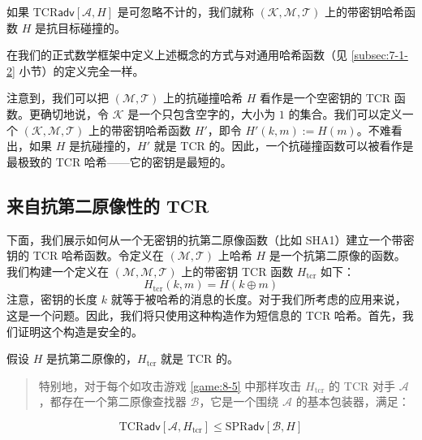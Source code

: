 \begin{definition}\label{def:8-7}
如果 $\mathrm{TCR}\mathsf{adv}[\mathcal{A},H]$ 是可忽略不计的，我们就称 $(\mathcal{K},\mathcal{M},\mathcal{T})$ 上的带密钥哈希函数 $H$ 是抗目标碰撞的。
\end{definition}


在我们的正式数学框架中定义上述概念的方式与对通用哈希函数（见 \ref{subsec:7-1-2} 小节）的定义完全一样。

注意到，我们可以把 $(\mathcal{M},\mathcal{T})$ 上的抗碰撞哈希 $H$ 看作是一个空密钥的 TCR 函数。更确切地说，令 $\mathcal{K}$ 是一个只包含空字的，大小为 $1$ 的集合。我们可以定义一个 $(\mathcal{K},\mathcal{M},\mathcal{T})$ 上的带密钥哈希函数 $H'$，即令 $H'(k,m):=H(m)$。不难看出，如果 $H$ 是抗碰撞的，$H'$ 就是 TCR 的。因此，一个抗碰撞函数可以被看作是最极致的 TCR 哈希——它的密钥是最短的。

\subsection{来自抗第二原像性的 TCR}\label{subsec:8-11-3}

下面，我们展示如何从一个无密钥的抗第二原像函数（比如 SHA1）建立一个带密钥的 TCR 哈希函数。令定义在 $(\mathcal{M},\mathcal{T})$ 上哈希 $H$ 是一个抗第二原像的函数。我们构建一个定义在 $(\mathcal{M},\mathcal{M},\mathcal{T})$ 上的带密钥 TCR 函数 $H_\mathrm{tcr}$ 如下：
\begin{equation}\label{eq:8-18}
H_\mathrm{tcr}(k,m)=H(k\oplus m)
\end{equation}
注意，密钥的长度 $k$ 就等于被哈希的消息的长度。对于我们所考虑的应用来说，这是一个问题。因此，我们将只使用这种构造作为短信息的 TCR 哈希。首先，我们证明这个构造是安全的。

\begin{theorem}\label{theo:8-12}
假设 $H$ 是抗第二原像的，$H_\mathrm{tcr}$ 就是 TCR 的。
\begin{quote}
特别地，对于每个如攻击游戏 \ref{game:8-5} 中那样攻击 $H_\mathrm{tcr}$ 的 TCR 对手 $\mathcal{A}$，都存在一个第二原像查找器 $\mathcal{B}$，它是一个围绕 $\mathcal{A}$ 的基本包装器，满足：
\end{quote}
\[
\mathrm{TCR}\mathsf{adv}[\mathcal{A},H_\mathrm{tcr}]
\leq
\mathrm{SPR}\mathsf{adv}[\mathcal{B},H]
\]
\end{theorem}

